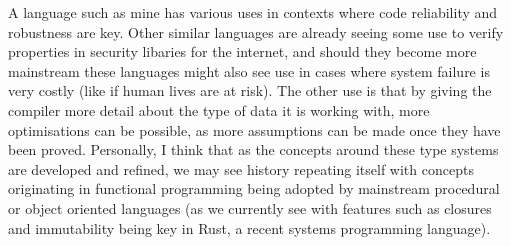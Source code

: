 A language such as mine has various uses in contexts where code reliability and robustness are key.
Other similar languages are already seeing some use to verify properties in security libaries for
the internet, and should they become more mainstream these languages might also see use in cases
where system failure is very costly (like if human lives are at risk).
The other use is that by giving the compiler more detail about the type of data it is working with,
more optimisations can be possible, as more assumptions can be made once they have been proved.
Personally, I think that as the concepts around these type systems are developed and refined,
we may see history repeating itself with concepts originating in functional programming being
adopted by mainstream procedural or object oriented languages (as we currently see with features
such as closures and immutability being key in Rust, a recent systems programming language).

